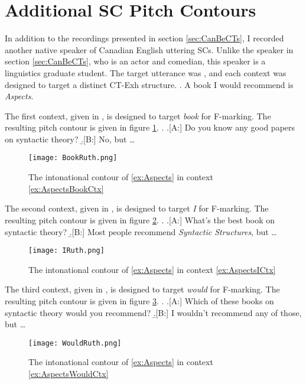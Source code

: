 \documentclass[letterpaper]{article}
\begin{document}
\appendix
\section{Additional SC Pitch Contours}\label{sec:append}
In addition to the recordings presented in section \ref{sec:CanBeCTs}, I recorded another native speaker of Canadian English uttering SCs.
Unlike the speaker in section \ref{sec:CanBeCTs}, who is an actor and comedian, this speaker is a linguistics graduate student.
The target utterance was \Next, and each context was designed to target a distinct CT-Exh structure.
\ex.\label{ex:Aspects} A book I would recommend is \textit{Aspects}.

The first context, given in \Next, is designed to target \textit{book} for F-marking.
The resulting pitch contour is given in figure \ref{fig:BookRuth}.
\ex. \label{ex:AspectsBookCtx}
\a.[A:] Do you know any good papers on syntactic theory?
\b.[B:] No, but \dots

\begin{figure}[h]
	\centering
	\texttt{[image: BookRuth.png]}
	\caption{The intonational contour of \ref{ex:Aspects} in context \ref{ex:AspectsBookCtx}}
	\label{fig:BookRuth}
\end{figure}
\FloatBarrier

The second context, given in \Next, is designed to target \textit{I} for F-marking.
The resulting pitch contour is given in figure \ref{fig:IRuth}.
\ex.\label{ex:AspectsICtx}
\a.[A:] What’s the best book on syntactic theory?
\b.[B:] Most people recommend \textit{Syntactic Structures}, but \dots

\begin{figure}[h]
	\centering
	\texttt{[image: IRuth.png]}
	\caption{The intonational contour of \ref{ex:Aspects} in context \ref{ex:AspectsICtx}}
	\label{fig:IRuth}
\end{figure}
\FloatBarrier

The third context, given in \Next, is designed to target \textit{would} for F-marking.
The resulting pitch contour is given in figure \ref{fig:WouldRuth}.
\ex.\label{ex:AspectsWouldCtx}
\a.[A:] Which of these books on syntactic theory would you recommend?
\b.[B:] I wouldn’t recommend any of those, but \dots

\begin{figure}[h]
	\centering
	\texttt{[image: WouldRuth.png]}
	\caption{The intonational contour of \ref{ex:Aspects} in context \ref{ex:AspectsWouldCtx}}
	\label{fig:WouldRuth}
\end{figure}
\FloatBarrier

\nocite{mikkelsen2004specifying}
\printbibliography
\end{document}
